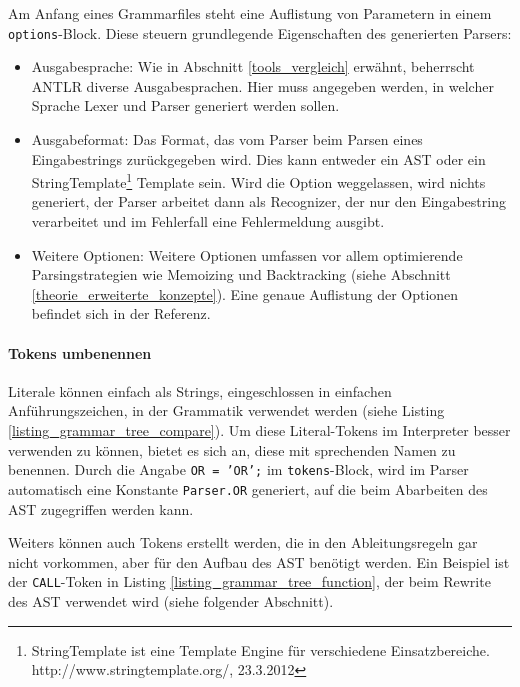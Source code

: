 Am Anfang eines Grammarfiles steht eine Auflistung von Parametern in einem \texttt{options}-Block. Diese steuern grundlegende Eigenschaften des generierten Parsers:

\begin{itemize}
  \item Ausgabesprache: Wie in Abschnitt \ref{tools_vergleich} erwähnt, beherrscht ANTLR diverse Ausgabesprachen. Hier muss angegeben werden, in welcher Sprache Lexer und Parser generiert werden sollen.

  \item Ausgabeformat: Das Format, das vom Parser beim Parsen eines Eingabestrings zurückgegeben wird. Dies kann entweder ein AST oder ein StringTemplate\footnote{StringTemplate ist eine Template Engine für verschiedene Einsatzbereiche. http://www.stringtemplate.org/, 23.3.2012} Template sein. Wird die Option weggelassen, wird nichts generiert, der Parser arbeitet dann als Recognizer, der nur den Eingabestring verarbeitet und im Fehlerfall eine Fehlermeldung ausgibt.

  \item Weitere Optionen: Weitere Optionen umfassen vor allem optimierende Parsingstrategien wie Memoizing und Backtracking (siehe Abschnitt \ref{theorie_erweiterte_konzepte}). Eine genaue Auflistung der Optionen befindet sich in der Re\-fe\-renz\cite{Parr07}.
\end{itemize}



\paragraph{Tokens umbenennen}

Literale können einfach als Strings, eingeschlossen in einfachen Anführungszeichen, in der Grammatik verwendet werden (siehe Listing \ref{listing_grammar_tree_compare}). Um diese Literal-Tokens im Interpreter besser verwenden zu können, bietet es sich an, diese mit sprechenden Namen zu benennen. Durch die Angabe \texttt{OR = 'OR';} im \texttt{tokens}-Block, wird im Parser automatisch eine Konstante \texttt{Parser.OR} generiert, auf die beim Abarbeiten des AST zugegriffen werden kann.

Weiters können auch Tokens erstellt werden, die in den Ableitungsregeln gar nicht vorkommen, aber für den Aufbau des AST benötigt werden. Ein Beispiel ist der \texttt{CALL}-Token in Listing \ref{listing_grammar_tree_function}, der beim Rewrite des AST verwendet wird (siehe folgender Abschnitt).

